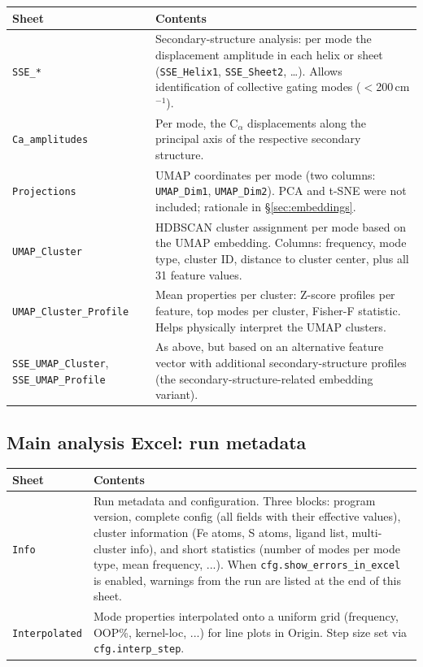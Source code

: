 \documentclass[11pt,a4paper,twoside]{article}
\theoremstyle{remark}
\begin{document}
\begin{longtable}{p{} p{}}
\toprule
\textbf{Sheet} & \textbf{Contents} \\
\midrule
\endhead

\texttt{SSE\_*} & Secondary-structure analysis: per mode the
  displacement amplitude in each helix or sheet
  (\texttt{SSE\_Helix1}, \texttt{SSE\_Sheet2}, \ldots). Allows
  identification of collective gating modes ($<$200\,cm$^{-1}$). \\

\texttt{Ca\_amplitudes} & Per mode, the C$_\alpha$ displacements
  along the principal axis of the respective secondary structure. \\

\texttt{Projections} & UMAP coordinates per mode (two columns:
  \texttt{UMAP\_Dim1}, \texttt{UMAP\_Dim2}). PCA and t-SNE were
  not included; rationale in \S\ref{sec:embeddings}. \\

\texttt{UMAP\_Cluster} & HDBSCAN cluster assignment per mode
  based on the UMAP embedding. Columns: frequency, mode type,
  cluster ID, distance to cluster center, plus all 31 feature
  values. \\

\texttt{UMAP\_Cluster\_Profile} & Mean properties per cluster:
  Z-score profiles per feature, top modes per cluster,
  Fisher-F statistic. Helps physically interpret the UMAP
  clusters. \\

\texttt{SSE\_UMAP\_Cluster}, \texttt{SSE\_UMAP\_Profile} & As above,
  but based on an alternative feature vector with additional
  secondary-structure profiles (the secondary-structure-related
  embedding variant). \\
\bottomrule
\end{longtable}

\subsection{Main analysis Excel: run metadata}

\begin{longtable}{p{} p{}}
\toprule
\textbf{Sheet} & \textbf{Contents} \\
\midrule
\endhead

\texttt{Info} & Run metadata and configuration. Three blocks:
  program version, complete config (all fields with their
  effective values), cluster information (Fe atoms, S atoms,
  ligand list, multi-cluster info), and short statistics
  (number of modes per mode type, mean frequency, ...).
  When \texttt{cfg.show\_errors\_in\_excel} is enabled, warnings
  from the run are listed at the end of this sheet. \\

\texttt{Interpolated} & Mode properties interpolated onto a
  uniform grid (frequency, OOP\%, kernel-loc, ...) for line
  plots in Origin. Step size set via \texttt{cfg.interp\_step}. \\
\bottomrule
\end{longtable}
\end{document}
